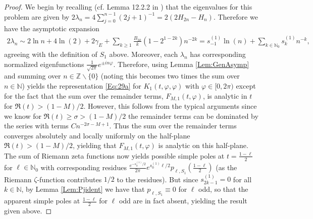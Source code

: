 \documentclass[letterpaper,10pt]{amsart}
\newcommand{\N}{\mathbb N}
\numberwithin{equation}{section}
\begin{document}
\begin{proof}
We begin by recalling (cf. Lemma 12.2.2 in \cite{MNP00}) that the eigenvalues for this problem are given by $2\lambda_n = 4\sum_{j=0}^{n-1}(2j+1)^{-1} = 2(2H_{2n}-H_n)$. Therefore we have the asymptotic expansion 
\begin{align}
    2\lambda_n \sim 2\ln n +4\ln(2)+2\gamma_E+\sum_{k \geq 1}\frac{B_{2k}}{k}(1-2^{1-2k})n^{-2k} = s_{-1}^{(1)}\ln(n)+\sum_{k\in \N_0}s_k^{(1)} n^{-k},
\end{align}
agreeing with the definition of $S_1$ above.
Moreover, each $\lambda_n$ has corresponding normalized eigenfunctions $\frac{1}{\sqrt{2\pi}}e^{\pm i n\varphi}$. Therefore, using Lemma \ref{Lem:GenAsymp} and summing over $n \in\mathbb{Z}\backslash \{0\}$ (noting this becomes two times the sum over $n\in\mathbb{N}$) yields the representation \eqref{Eq:29a} for $K_1(t,\varphi,\varphi)$ with $\varphi \in [0,2\pi)$ except for the fact that the sum over the remainder terms, $F_{M,1}(t,\varphi)$, is analytic in $t$ for $\Re(t)>(1-M)/2$. However, this follows from the typical arguments since we know for $\Re(t)\geq\sigma>(1-M)/2$ the remainder terms can be dominated by the series with terms $C n^{-2\sigma-M+1}$. Thus the sum over the remainder terms converges absolutely and locally uniformly on the half-plane $\Re(t)>(1-M)/2$, yielding that $F_{M,1}(t,\varphi)$ is analytic on this half-plane.
The sum of Riemann zeta functions now yields possible simple poles at $t = \frac{1-\ell}{2}$ for $\ell \in \N_0$ with corresponding residues $\frac{e^{-s_0^{(1)}/2}}{2\pi}e^{s_0^{(1)}\ell/2}p_{\ell,S_1}(\tfrac{1-\ell}{2})$ (as the Riemann $\zeta$-function contributes $1/2$ to the residues). But since $s_{2k-1}^{(1)}=0$ for all $k \in \N$, by Lemma \ref{Lem:Pjident} we have that $p_{\ell,S_1}\equiv 0$ for $\ell$ odd, so that the apparent simple poles at $\frac{1-\ell}{2}$ for $\ell$ odd are in fact absent, yielding the result given above.


\end{proof}
\end{document}
